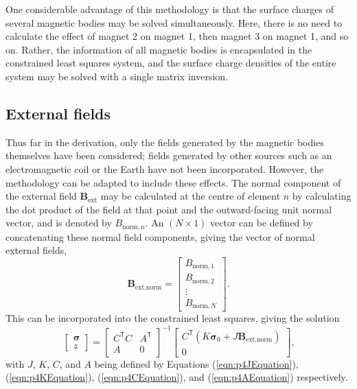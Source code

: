 One considerable advantage of this methodology is that the surface charges of several magnetic bodies may be solved simultaneously. Here, there is no need to calculate the effect of magnet 2 on magnet 1, then magnet 3 on magnet 1, and so on. Rather, the information of all magnetic bodies is encapsulated in the constrained least squares system, and the surface charge densities of the entire system may be solved with a single matrix inversion.

\subsection{External fields}\label{sec:p4externalFields}
Thus far in the derivation, only the fields generated by the magnetic bodies themselves have been considered; fields generated by other sources such as an electromagnetic coil or the Earth have not been incorporated. However, the methodology can be adapted to include these effects. The normal component of the external field \(\mathbf{B}_\text{ext}\) may be calculated at the centre of element \(n\) by calculating the dot product of the field at that point and the outward-facing unit normal vector, and is denoted by \(B_{\text{norm},n}\). An \(\left(N\times 1\right)\) vector can be defined by concatenating these normal field components, giving the vector of normal external fields,
\begin{equation}
    \mathbf{B}_\text{ext,norm} = \begin{bmatrix} B_{\text{norm},1} \\ B_{\text{norm},2} \\ \vdots \\ B_{\text{norm},N} \end{bmatrix} \text{.}
\end{equation}
This can be incorporated into the constrained least squares, giving the solution
\begin{equation}\label{eqn:p4externalMultiMagnetSolution}
    \begin{bmatrix} \bm{\sigma} \\ z \end{bmatrix} = \begin{bmatrix} C^\mathsf{T}C & A^\mathsf{T} \\ A & 0 \end{bmatrix}^{-1} \begin{bmatrix} C^\mathsf{T} \left( K \bm{\sigma}_0 + J\mathbf{B}_\text{ext,norm} \right) \\ 0 \end{bmatrix} \text{,}
\end{equation}
with \(J\), \(K\), \(C\), and \(A\) being defined by Equations (\ref{eqn:p4JEquation}), (\ref{eqn:p4KEquation}), (\ref{eqn:p4CEquation}), and (\ref{eqn:p4AEquation}) respectively.

